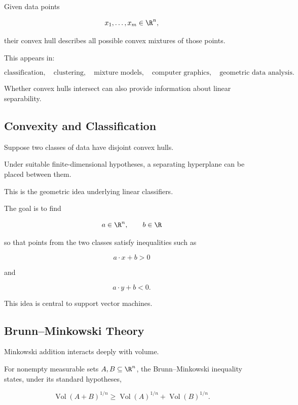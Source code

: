 Given data points

\[
x_1,\ldots,x_m\in\R^n,
\]

their convex hull describes all possible convex mixtures of those points.

This appears in:

\[
\boxed{
\text{classification},
\quad
\text{clustering},
\quad
\text{mixture models},
\quad
\text{computer graphics},
\quad
\text{geometric data analysis}.
}
\]

Whether convex hulls intersect can also provide information about linear
separability.

\subsection{Convexity and Classification}
\label{subsec:convexity-classification}

Suppose two classes of data have disjoint convex hulls.

Under suitable finite-dimensional hypotheses, a separating hyperplane can
be placed between them.

This is the geometric idea underlying linear classifiers.

The goal is to find

\[
a\in\R^n,
\qquad
b\in\R
\]

so that points from the two classes satisfy inequalities such as

\[
a\cdot x+b>0
\]

and

\[
a\cdot y+b<0.
\]

This idea is central to support vector machines.

\subsection{Brunn--Minkowski Theory}
\label{subsec:brunn-minkowski-preview}

Minkowski addition interacts deeply with volume.

For nonempty measurable sets \(A,B\subseteq\R^n\), the
Brunn--Minkowski inequality states, under its standard hypotheses,

\[
\boxed{
\operatorname{Vol}(A+B)^{1/n}
\geq
\operatorname{Vol}(A)^{1/n}
+
\operatorname{Vol}(B)^{1/n}.
}
\]

